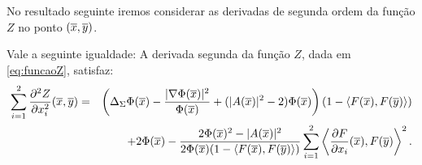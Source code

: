 No resultado seguinte iremos considerar as derivadas de segunda
ordem da função $Z$ no ponto $(\overline{x},\overline{y})$.

\begin{proposicao}
	Vale a seguinte igualdade:
	A derivada segunda da fun\c c\~ao $Z$, dada em \eqref{eq:funcaoZ},
	satisfaz:
	\begin{eqnarray*}\label{2_diff_Z_x}
		\sum_{i=1}^{2} \frac{\partial^2 Z}{\partial x_i^2} (\overline{x},\overline{y}) &=& 
		\left( \Delta_{\Sigma} \Phi(\overline{x}) - \frac{| \nabla \Phi(\overline{x}) |^2}{\Phi(\overline{x})} 
		+ (|A(\overline{x})|^2 - 2) \Phi(\overline{x}) \right) (1 - \left\langle F(\overline{x}), F(\overline{y}) \right\rangle) \\ 
		&&+ 2 \Phi(\overline{x}) - \frac{2 \Phi(\overline{x})^2 - |A(\overline{x})|^2}{2 \Phi(\overline{x})
			(1 - \langle F(\overline{x}), F(\overline{y}) \rangle)} \sum_{i=1}^2 \left\langle 
		\frac{\partial F}{\partial x_i}(\overline{x}), F(\overline{y}) \right\rangle^2.
	\end{eqnarray*}
\end{proposicao}

